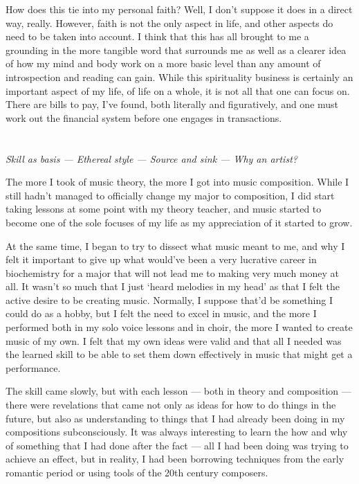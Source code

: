 \documentclass{book}
\begin{document}
How does this tie into my personal faith? Well, I don't suppose it does in a direct way, really.  However, faith is not the only aspect in life, and other aspects do need to be taken into account.  I think that this has all brought to me a grounding in the more tangible word that surrounds me as well as a clearer idea of how my mind and body work on a more basic level than any amount of introspection and reading can gain.  While this spirituality business is certainly an important aspect of my life, of life on a whole, it is not all that one can focus on.  There are bills to pay, I've found, both literally and figuratively, and one must work out the financial system before one engages in transactions.

\chapter{}
\begin{center}
	\emph{Skill as basis --- Ethereal style --- Source and sink --- Why an artist?}
\end{center}

The more I took of music theory, the more I got into music composition.  While I still hadn't managed to officially change my major to composition, I did start taking lessons at some point with my theory teacher, and music started to become one of the sole focuses of my life as my appreciation of it started to grow.

At the same time, I began to try to dissect what music meant to me, and why I felt it important to give up what would've been a very lucrative career in biochemistry for a major that will not lead me to making very much money at all.  It wasn't so much that I just `heard melodies in my head' as that I felt the active desire to be creating music.  Normally, I suppose that'd be something I could do as a hobby, but I felt the need to excel in music, and the more I performed both in my solo voice lessons and in choir, the more I wanted to create music of my own.  I felt that my own ideas were valid and that all I needed was the learned skill to be able to set them down effectively in music that might get a performance.

The skill came slowly, but with each lesson --- both in theory and composition --- there were revelations that came not only as ideas for how to do things in the future, but also as understanding to things that I had already been doing in my compositions subconsciously.  It was always interesting to learn the how and why of something that I had done after the fact --- all I had been doing was trying to achieve an effect, but in reality, I had been borrowing techniques from the early romantic period or using tools of the 20th century composers.
\end{document}
